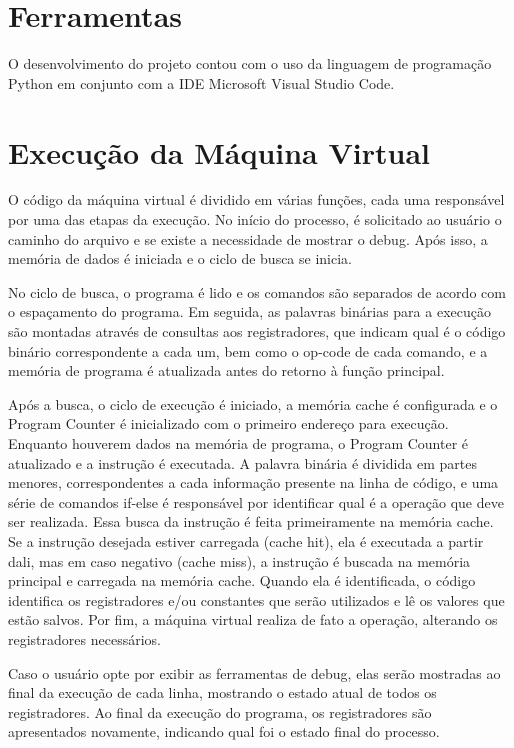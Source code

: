 \documentclass[
	12pt,				%
	oneside,			%
	a4paper,			%
	english,			%
	french,				%
	spanish,			%
	brazil				%
	]{abntex2}
\begin{document}
\section{Ferramentas}

O desenvolvimento do projeto contou com o uso da linguagem de programação Python em conjunto com a IDE Microsoft Visual Studio Code.

\section{Execução da Máquina Virtual}

O código da máquina virtual é dividido em várias funções, cada uma responsável por uma das etapas da execução. No início do processo, é solicitado ao usuário o caminho do arquivo e se existe a necessidade de mostrar o debug. Após isso, a memória de dados é iniciada e o ciclo de busca se inicia.

No ciclo de busca, o programa é lido e os comandos são separados de acordo com o espaçamento do programa. Em seguida, as palavras binárias para a execução são montadas através de consultas aos registradores, que indicam qual é o código binário correspondente a cada um, bem como o op-code de cada comando, e a memória de programa é atualizada antes do retorno à função principal.

Após a busca, o ciclo de execução é iniciado, a memória cache é configurada e o Program Counter é inicializado com o primeiro endereço para execução. Enquanto houverem dados na memória de programa, o Program Counter é atualizado e a instrução é executada. A palavra binária é dividida em partes menores, correspondentes a cada informação presente na linha de código, e uma série de comandos if-else é responsável por identificar qual é a operação que deve ser realizada. Essa busca da instrução é feita primeiramente na memória cache. Se a instrução desejada estiver carregada (cache hit), ela é executada a partir dali, mas em caso negativo (cache miss), a instrução é buscada na memória principal e carregada na memória cache. Quando ela é identificada, o código identifica os registradores e/ou constantes que serão utilizados e lê os valores que estão salvos. Por fim, a máquina virtual realiza de fato a operação, alterando os registradores necessários. 

Caso o usuário opte por exibir as ferramentas de debug, elas serão mostradas ao final da execução de cada linha, mostrando o estado atual de todos os registradores. Ao final da execução do programa, os registradores são apresentados novamente, indicando qual foi o estado final do processo.
\end{document}
